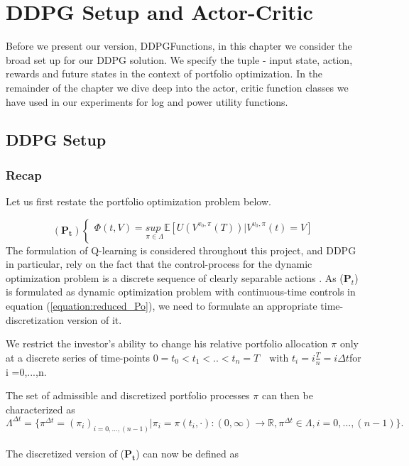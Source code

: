 \chapter{DDPG Setup and Actor-Critic }\label{chapter:ExperimentSetup}
Before we present our version, DDPGFunctions, in this chapter we consider the broad set up for our DDPG solution. We specify the tuple - input state, action,  rewards and future states in the context of portfolio optimization. 
In the remainder of the chapter we dive deep into the actor, critic function classes  we have used in our experiments for log and power  utility functions.




\section{DDPG Setup} 
 \subsection{Recap}
 Let us first restate the portfolio optimization problem below. 
 
 \begin{equation}
    (\mathbf{P_t}) \begin{cases}
     \Phi(t,V) = \underset{\pi \in \Lambda}{\textit{sup }}\mathbb{ E}[U(V^{v_0,\pi}(T)) | V^{v_0,\pi}(t)=V]
     \end{cases}
 \end{equation}
The formulation of Q-learning is considered throughout this project, and DDPG in particular, rely on the fact that the control-process for the dynamic optimization problem is a discrete sequence of clearly separable actions \cite{RL_ArtInt_268}. As ($\textbf{P}_t$) is formulated as dynamic optimization problem with continuous-time
controls in equation (\ref{equation:reduced_Po}), we need to formulate an appropriate time-discretization version of it.

 We restrict the investor’s ability to change his relative portfolio allocation $\pi$ only at a discrete series of time-points
 $0=t_0<t_1<..<t_n=T \quad \text{with } t_i = i\frac{T}{n} = i\Delta t$\quad for i =0,...,n.    

 The set of admissible and discretized portfolio processes $\pi$ can then be characterized as    
 $$\Lambda^{\Delta t} = \Big\{\pi^{\Delta t} = (\pi_i)_{i=0,...,(n-1)} | \pi_i = \pi(t_i,\cdot) : (0,\infty) \rightarrow \mathbb{R}, \pi^{\Delta t} \in \Lambda , i=0,...,(n-1)\Big\}.$$\\
The discretized version of ($\mathbf{P}_\mathbf{t}$) can now be defined as 

